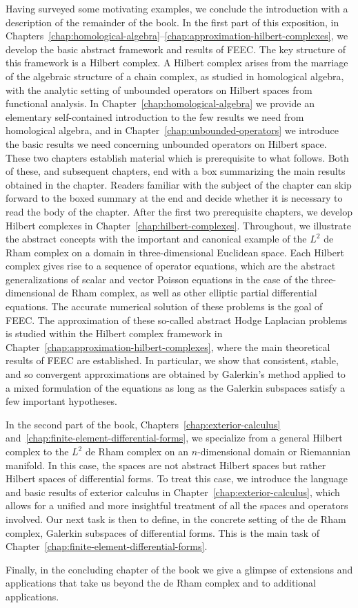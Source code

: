 {Having surveyed some motivating examples, we conclude the introduction with a description of the remainder of the book. In the first part of this exposition, in Chapters~\ref{chap:homological-algebra}--\ref{chap:approximation-hilbert-complexes}, we develop the basic abstract framework and results of FEEC. The key structure of this framework is a Hilbert complex. A Hilbert complex arises from the marriage of the algebraic structure of a chain complex, as studied in homological algebra, with the analytic setting of unbounded operators on Hilbert spaces from functional analysis. In Chapter~\ref{chap:homological-algebra} we provide an elementary self-contained introduction to the few results we need from homological algebra, and in Chapter~\ref{chap:unbounded-operators} we introduce the basic results we need concerning unbounded operators on Hilbert space. These two chapters establish material which is prerequisite to what follows. Both of these, and subsequent chapters, end with a box summarizing the main results obtained in the chapter. Readers familiar with the subject of the chapter can skip forward to the boxed summary at the end and decide whether it is necessary to read the body of the chapter. After the first two prerequisite chapters, we develop Hilbert complexes in Chapter~\ref{chap:hilbert-complexes}. Throughout, we illustrate the abstract concepts with the important and canonical example of the $L^2$ de Rham complex on a domain in three-dimensional Euclidean space. Each Hilbert complex gives rise to a sequence of operator equations, which are the abstract generalizations of scalar and vector Poisson equations in the case of the three-dimensional de Rham complex, as well as other elliptic partial differential equations. The accurate numerical solution of these problems is the goal of FEEC. The approximation of these so-called abstract Hodge Laplacian problems is studied within the Hilbert complex framework in Chapter~\ref{chap:approximation-hilbert-complexes}, where the main theoretical results of FEEC are established. In particular, we show that consistent, stable, and so convergent approximations are obtained by Galerkin's method applied to a mixed formulation of the equations as long as the Galerkin subspaces satisfy a few important hypotheses.}

{In the second part of the book, Chapters~\ref{chap:exterior-calculus} and~\ref{chap:finite-element-differential-forms}, we specialize from a general Hilbert complex to the $L^2$ de Rham complex on an $n$-dimensional domain or Riemannian manifold. In this case, the spaces are not abstract Hilbert spaces but rather Hilbert spaces of differential forms. To treat this case, we introduce the language and basic results of exterior calculus in Chapter~\ref{chap:exterior-calculus}, which allows for a unified and more insightful treatment of all the spaces and operators involved. Our next task is then to define, in the concrete setting of the de Rham complex, Galerkin subspaces of differential forms. This is the main task of Chapter~\ref{chap:finite-element-differential-forms}.}

{Finally, in the concluding chapter of the book we give a glimpse of extensions and applications that take us beyond the de Rham complex and to additional applications.}
